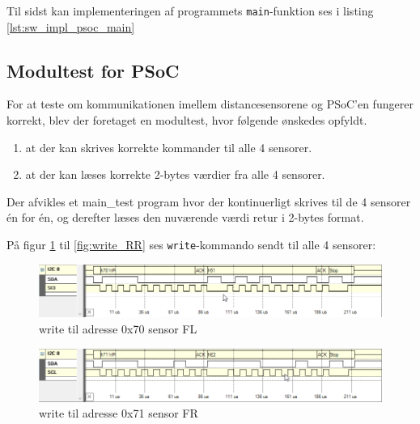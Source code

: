 Til sidst kan implementeringen af programmets \texttt{main}-funktion ses i listing \ref{lst:sw_impl_psoc_main}



\clearpage

\subsection{Modultest for PSoC}

For at teste om kommunikationen imellem distancesensorene og PSoC'en fungerer korrekt, blev der foretaget en modultest, hvor følgende ønskedes opfyldt. 

\begin{enumerate}
  \item at der kan skrives korrekte kommander til alle 4 sensorer.
  \item at der kan læses korrekte 2-bytes værdier fra alle 4 sensorer.
\end{enumerate}

Der afvikles et main\_test program hvor der kontinuerligt skrives til de 4 sensorer én for én, og derefter læses den nuværende værdi retur i 2-bytes format. 

På figur \ref{fig:write_FL} til \ref{fig:write_RR} ses \texttt{write}-kommando sendt til alle 4 sensorer: 

\begin{figure}[h]
	\centering
	\includegraphics[scale=0.6]{../fig/billeder/psoc_distancesensor_modultest/I2C_write_0x70_FL.png}
	\caption{write til adresse 0x70 sensor FL}
	\label{fig:write_FL}
\end{figure}

\begin{figure}[h]
	\centering
	\includegraphics[scale=0.6]{../fig/billeder/psoc_distancesensor_modultest/I2C_write_0x71_FR.png}
	\caption{write til adresse 0x71 sensor FR}
	\label{fig:write_FR}
\end{figure}

